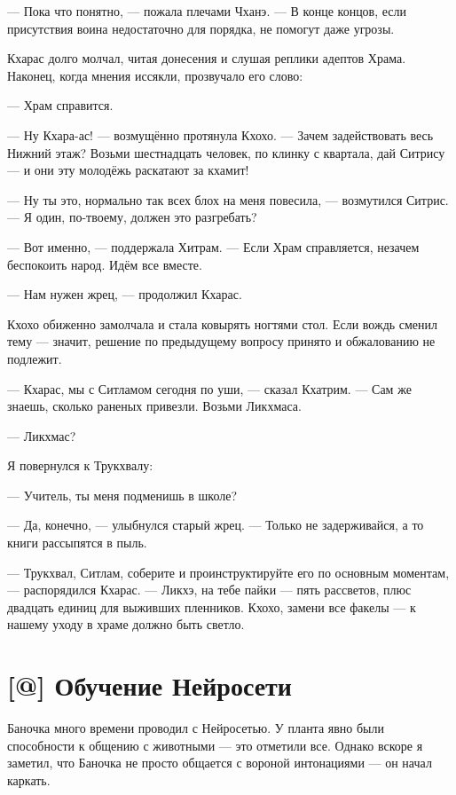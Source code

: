 --- Пока что понятно, --- пожала плечами Чханэ.
--- В конце концов, если присутствия воина недостаточно для порядка, не помогут даже угрозы.

\asterism

Кхарас долго молчал, читая донесения и слушая реплики адептов Храма.
Наконец, когда мнения иссякли, прозвучало его слово:

--- Храм справится.

--- Ну Кхара-ас! --- возмущённо протянула Кхохо.
--- Зачем задействовать весь Нижний этаж?
Возьми шестнадцать человек, по клинку с квартала, дай Ситрису --- и они эту молодёжь раскатают за кхамит!

--- Ну ты это, нормально так всех блох на меня повесила, --- возмутился Ситрис.
--- Я один, по-твоему, должен это разгребать?

--- Вот именно, --- поддержала Хитрам.
--- Если Храм справляется, незачем беспокоить народ.
Идём все вместе.

--- Нам нужен жрец, --- продолжил Кхарас.

Кхохо обиженно замолчала и стала ковырять ногтями стол.
Если вождь сменил тему --- значит, решение по предыдущему вопросу принято и обжалованию не подлежит.

--- Кхарас, мы с Ситламом сегодня по уши, --- сказал Кхатрим.
--- Сам же знаешь, сколько раненых привезли.
Возьми Ликхмаса.

--- Ликхмас?

Я повернулся к Трукхвалу:

--- Учитель, ты меня подменишь в школе?

--- Да, конечно, --- улыбнулся старый жрец.
--- Только не задерживайся, а то книги рассыпятся в пыль.

--- Трукхвал, Ситлам, соберите и проинструктируйте его по основным моментам, --- распорядился Кхарас.
--- Ликхэ, на тебе пайки --- пять рассветов, плюс двадцать единиц для выживших пленников.
Кхохо, замени все факелы --- к нашему уходу в храме должно быть светло.


\section{[@] Обучение Нейросети}

\textspace

Баночка много времени проводил с Нейросетью.
У планта явно были способности к общению с животными --- это отметили все.
Однако вскоре я заметил, что Баночка не просто общается с вороной интонациями --- он начал каркать.

